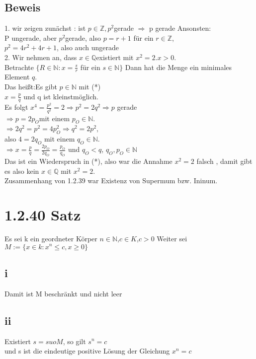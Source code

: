\documentclass[11pt]{scrartcl}
\begin{document}
\subsection*{Beweis}
1. wir zeigen zunächst : ist $p \in \mathbb{Z}, p^2$gerade $\Rightarrow$ p gerade
Ansonsten: \\
P ungerade, aber $p^2$gerade, also $p=r+1$ für ein $r \in \mathbb{Z}$, \\
$p^2= 4r^2 +4r +1$, also auch ungerade \\

2. Wir nehmen an, dass $x \in \mathbb{Q}$existiert mit $x^2=2$.$x > 0$. \\
Betrachte $\{ R \in \mathbb{N} : x = \frac{s}{r}$ für ein $s \in \mathbb{N}\}$ Dann hat die Menge ein minimales Element $q$. \\
Das heißt:Es gibt $p \in \mathbb{N}$ mit (*) \\
$x = \frac{p}{q}$ und q ist kleinstmöglich. \\
Es folgt $x^4 = \frac{p^2}{q^2} = 2 \Rightarrow p^2 = 2q^2 \Rightarrow p$ gerade \\
$\Rightarrow p=2 p_O$mit einem $p_O \in \mathbb{N}$. \\
$\Rightarrow 2q^2 = p^2 = 4 p_O^2 \Rightarrow q^2 = 2p^2$, \\
also $4= 2 q_O$ mit einem $q_O \in \mathbb{N}$. \\
$\Rightarrow x = \frac{p}{q} = \frac{2 p_O}{2 q_O} = \frac{p_O}{q_O}$ und $q_O < q$, $q_O, p_O \in \mathbb{N}$ \\
Das ist ein Wiederspruch  in (*), also war die Annahme $x^2 =2$ falsch , damit gibt es also kein $x \in \mathbb{Q}$ mit $x^2 = 2$. \\
Zusammenhang von 1.2.39 war Existenz von Supermum bzw. Ininum.

\section{1.2.40 Satz}
Es sei k ein geordneter Körper $n \in \mathbb{N}$,$c \in K$,$c > 0$ Weiter sei \\
$M := \{ x \in k : x^n \leq c, x \geq 0 \}$
\subsection{i}
Damit ist M beschränkt und nicht leer
\subsection{ii}
Existiert $s= suo M$, so gilt $s^n = c$ \\
und s ist die eindeutige positive Lösung der Gleichung $x^n = c$
\end{document}
